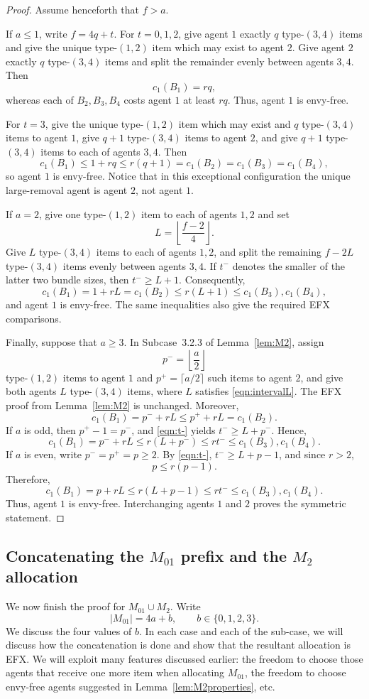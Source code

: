 \documentclass{article}
\theoremstyle{definition}
\begin{document}
\begin{proof}
Assume henceforth that $f>a$.

If $a\le 1$, write $f=4q+t$.
For $t=0,1,2$, give agent $1$ exactly $q$ type-$(3,4)$ items and give the
unique type-$(1,2)$ item which may exist to agent $2$.  Give agent $2$ exactly $q$
type-$(3,4)$ items and split the remainder evenly between agents $3,4$.
Then
\[
 c_1(B_1)=rq,
\]
whereas each of $B_2,B_3,B_4$ costs agent $1$ at least $r q$.  Thus, agent $1$ is envy-free.

For $t=3$, give the unique type-$(1,2)$ item which may exist and $q$ type-$(3,4)$ items
to agent $1$, give $q+1$ type-$(3,4)$ items to agent $2$, and give
$q+1$ type-$(3,4)$ items to each of agents $3,4$.  Then
\[
 c_1(B_1)\le 1+rq\le r(q+1)
 =c_1(B_2)=c_1(B_3)=c_1(B_4),
\]
so agent $1$ is envy-free.  Notice that in this exceptional
configuration the unique large-removal agent is agent $2$, not agent $1$.

If $a=2$, give one type-$(1,2)$ item to each of agents $1,2$ and set
\[
 L=\left\lfloor\frac{f-2}{4}\right\rfloor.
\]
Give $L$ type-$(3,4)$ items to each of agents $1,2$, and split the
remaining $f-2L$ type-$(3,4)$ items evenly between agents $3,4$.  If
$t^-$ denotes the smaller of the latter two bundle sizes, then
$t^-\ge L+1$.  Consequently,
\[
 c_1(B_1)=1+rL=c_1(B_2)
 \le r(L+1)\le c_1(B_3),c_1(B_4),
\]
and agent $1$ is envy-free.  The same inequalities also give the
required EFX comparisons.

Finally, suppose that $a\ge3$.  In Subcase~3.2.3 of Lemma~\ref{lem:M2}, assign
\[
 p^-=\left\lfloor\frac a2\right\rfloor
\]
type-$(1,2)$ items to agent $1$ and
$p^+=\lceil a/2\rceil$ such items to agent $2$, and give both agents $L$
type-$(3,4)$ items, where $L$ satisfies \eqref{eqn:intervalL}.  The EFX proof from Lemma~\ref{lem:M2}
is unchanged.  Moreover,
\[
 c_1(B_1)=p^-+rL\le p^++rL=c_1(B_2).
\]
If $a$ is odd, then $p^+-1=p^-$, and \eqref{eqn:t-} yields
$t^-\ge L+p^-$.  Hence,
\[
 c_1(B_1)=p^-+rL
 \le r(L+p^-)
 \le rt^-
 \le c_1(B_3),c_1(B_4).
\]
If $a$ is even, write $p^-=p^+=p\ge2$.  By \eqref{eqn:t-},
$t^-\ge L+p-1$, and since $r>2$,
\[
 p\le r(p-1).
\]
Therefore,
\[
 c_1(B_1)=p+rL
 \le r(L+p-1)
 \le rt^-
 \le c_1(B_3),c_1(B_4).
\]
Thus, agent $1$ is envy-free.  Interchanging agents $1$ and $2$
proves the symmetric statement.
\end{proof}


\subsection{Concatenating the $M_{01}$ prefix and the $M_2$ allocation}
\label{subsec:combine}
We now finish the proof for $M_{01}\cup M_2$.  Write
\[
 |M_{01}|=4a+b,
 \qquad b\in\{0,1,2,3\}.
\]
We discuss the four values of $b$.
In each case and each of the sub-case, we will discuss how the concatenation is done and show that the resultant allocation is EFX.
We will exploit many features discussed earlier: the freedom to choose those agents that receive one more item when allocating $M_{01}$, the freedom to choose envy-free agents suggested in Lemma~\ref{lem:M2properties}, etc.
\end{document}
